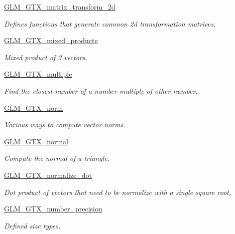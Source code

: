 \begin{CompactItemize}
\item 
\hyperlink{group__gtx__matrix__transform__2d}{GLM\_\-GTX\_\-matrix\_\-transform\_\-2d}
\begin{CompactList}\small\item\em Defines functions that generate common 2d transformation matrices. \item\end{CompactList}

\item 
\hyperlink{group__gtx__mixed__product}{GLM\_\-GTX\_\-mixed\_\-producte}
\begin{CompactList}\small\item\em Mixed product of 3 vectors. \item\end{CompactList}

\item 
\hyperlink{group__gtx__multiple}{GLM\_\-GTX\_\-multiple}
\begin{CompactList}\small\item\em Find the closest number of a number multiple of other number. \item\end{CompactList}

\item 
\hyperlink{group__gtx__norm}{GLM\_\-GTX\_\-norm}
\begin{CompactList}\small\item\em Various ways to compute vector norms. \item\end{CompactList}

\item 
\hyperlink{group__gtx__normal}{GLM\_\-GTX\_\-normal}
\begin{CompactList}\small\item\em Compute the normal of a triangle. \item\end{CompactList}

\item 
\hyperlink{group__gtx__normalize__dot}{GLM\_\-GTX\_\-normalize\_\-dot}
\begin{CompactList}\small\item\em Dot product of vectors that need to be normalize with a single square root. \item\end{CompactList}

\item 
\hyperlink{group__gtx__number__precision}{GLM\_\-GTX\_\-number\_\-precision}
\begin{CompactList}\small\item\em Defined size types. \item\end{CompactList}


\end{CompactItemize}
